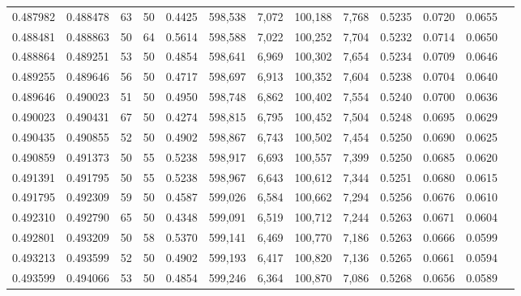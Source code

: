 \begin{tabular}{rrrrrrrrrrrrr}
0.487982 & 0.488478 &    63 &  50 &                                     0.4425 & 598,538 &   7,072 & 100,188 &   7,768 & 0.5235 & 0.0720 & 0.0655 \\
0.488481 & 0.488863 &    50 &  64 &                                     0.5614 & 598,588 &   7,022 & 100,252 &   7,704 & 0.5232 & 0.0714 & 0.0650 \\
0.488864 & 0.489251 &    53 &  50 &                                     0.4854 & 598,641 &   6,969 & 100,302 &   7,654 & 0.5234 & 0.0709 & 0.0646 \\
0.489255 & 0.489646 &    56 &  50 &                                     0.4717 & 598,697 &   6,913 & 100,352 &   7,604 & 0.5238 & 0.0704 & 0.0640 \\
0.489646 & 0.490023 &    51 &  50 &                                     0.4950 & 598,748 &   6,862 & 100,402 &   7,554 & 0.5240 & 0.0700 & 0.0636 \\
0.490023 & 0.490431 &    67 &  50 &                                     0.4274 & 598,815 &   6,795 & 100,452 &   7,504 & 0.5248 & 0.0695 & 0.0629 \\
0.490435 & 0.490855 &    52 &  50 &                                     0.4902 & 598,867 &   6,743 & 100,502 &   7,454 & 0.5250 & 0.0690 & 0.0625 \\
0.490859 & 0.491373 &    50 &  55 &                                     0.5238 & 598,917 &   6,693 & 100,557 &   7,399 & 0.5250 & 0.0685 & 0.0620 \\
0.491391 & 0.491795 &    50 &  55 &                                     0.5238 & 598,967 &   6,643 & 100,612 &   7,344 & 0.5251 & 0.0680 & 0.0615 \\
0.491795 & 0.492309 &    59 &  50 &                                     0.4587 & 599,026 &   6,584 & 100,662 &   7,294 & 0.5256 & 0.0676 & 0.0610 \\
0.492310 & 0.492790 &    65 &  50 &                                     0.4348 & 599,091 &   6,519 & 100,712 &   7,244 & 0.5263 & 0.0671 & 0.0604 \\
0.492801 & 0.493209 &    50 &  58 &                                     0.5370 & 599,141 &   6,469 & 100,770 &   7,186 & 0.5263 & 0.0666 & 0.0599 \\
0.493213 & 0.493599 &    52 &  50 &                                     0.4902 & 599,193 &   6,417 & 100,820 &   7,136 & 0.5265 & 0.0661 & 0.0594 \\
0.493599 & 0.494066 &    53 &  50 &                                     0.4854 & 599,246 &   6,364 & 100,870 &   7,086 & 0.5268 & 0.0656 & 0.0589 \\

\end{tabular}

